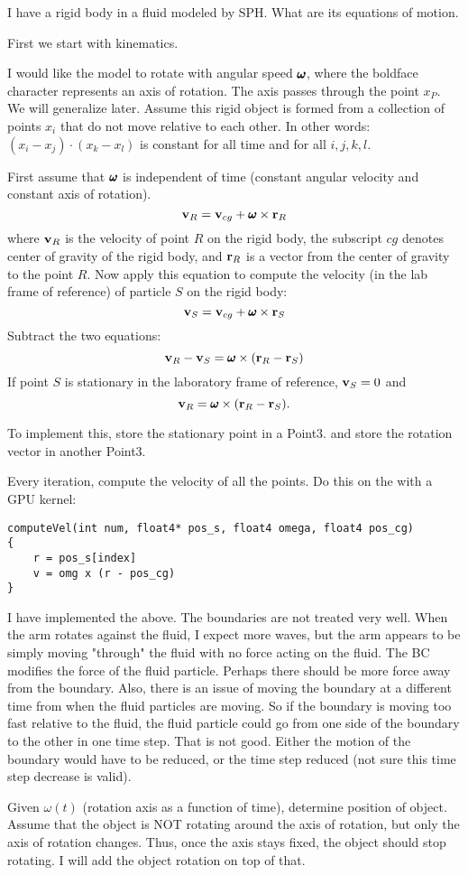 \documentclass[11pt]{article}
\begin{document}
I have a rigid body in a fluid modeled by SPH. What are its equations 
of motion. 

First we start with kinematics. 

I would like the model to rotate with angular speed $\omgvec$, where the 
boldface character represents an axis of rotation. The axis passes
through the point $x_P$.  We will generalize later. Assume this rigid
object is formed from a collection of points $x_i$ that do not move 
relative to each other. In other words: $(x_i-x_j)\cdot(x_k-x_l)$ is 
constant for all time and for all $i,j,k,l$. 

First assume that $\omgvec$ is independent of time (constant angular
velocity and constant axis of rotation).
$$
\vvec_R = \vvec_{cg} + \omgvec \times \rvec_R
$$
where ${\bf v}_R$ is the velocity of point $R$ on the rigid body, the 
subscript $cg$  denotes center of gravity of the rigid body, 
and ${\bf r}_R$ is a vector from the center of gravity to the point $R$. 
Now apply this equation to compute the velocity (in the lab frame of 
reference) of particle $S$ on the rigid body: 
$$
\vvec_S = \vvec_{cg} + \omgvec \times \rvec_S
$$
Subtract the two equations: 
$$
\vvec_R-\vvec_S = \omgvec \times (\rvec_R-\rvec_S)
$$
If point $S$ is stationary in the laboratory frame of reference, 
${\bf v}_S=0$ and
$$
\vvec_R = \omgvec \times (\rvec_R-\rvec_S) .
$$

To implement this, store the stationary point in a Point3.
and store the rotation vector in another Point3. 

Every iteration, compute the velocity of all the points. Do this on the 
with a GPU kernel: 

\begin{verbatim}
computeVel(int num, float4* pos_s, float4 omega, float4 pos_cg)
{
    r = pos_s[index] 
    v = omg x (r - pos_cg)
}
\end{verbatim}

I have implemented the above. The boundaries are not treated very well. When the arm rotates against the fluid, I expect more waves, but the arm appears to be simply moving "through" the fluid with no force acting on the fluid. The BC modifies the force of the fluid
particle. Perhaps there should be more force away from the boundary. 
Also, there is an issue of moving the boundary at a different time from when the fluid particles are moving. So if the boundary is moving too fast relative to the fluid, the fluid
particle could go from one side of the boundary to the other in one time step. That is not good. Either the motion of the boundary would have to be reduced, or the time step reduced (not sure this time step decrease is valid).

Given $\omega(t)$ (rotation axis as a function of time), 
determine position of object. 
Assume that the object is NOT rotating around the axis of 
rotation, but only the axis of rotation changes. 
Thus, once the axis stays fixed, the object should stop rotating. 
I will add the object rotation on top of that. 
\end{document}
